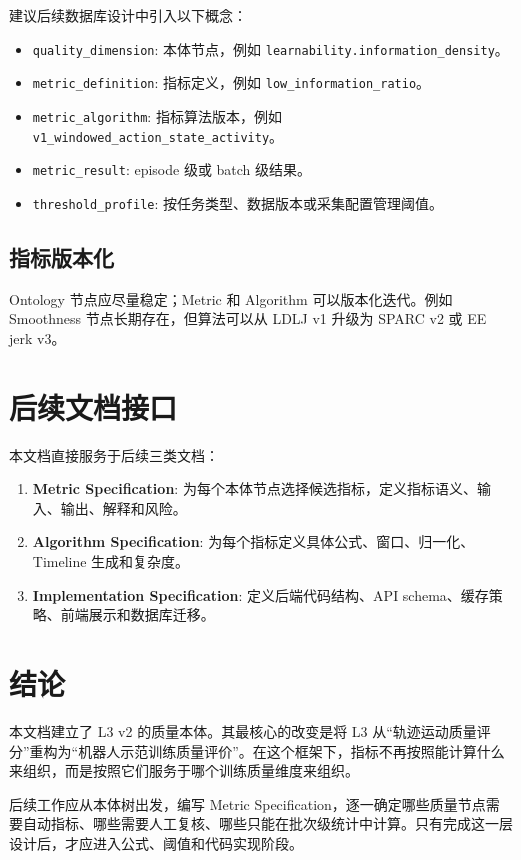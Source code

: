 \documentclass[UTF8,zihao=-4]{ctexart}
\newcommand{\Code}[1]{\texttt{#1}}
\newcommand{\Term}[1]{\textbf{#1}}
\begin{document}
建议后续数据库设计中引入以下概念：
\begin{itemize}
  \item \Code{quality\_dimension}: 本体节点，例如 \Code{learnability.information\_density}。
  \item \Code{metric\_definition}: 指标定义，例如 \Code{low\_information\_ratio}。
  \item \Code{metric\_algorithm}: 指标算法版本，例如 \Code{v1\_windowed\_action\_state\_activity}。
  \item \Code{metric\_result}: episode 级或 batch 级结果。
  \item \Code{threshold\_profile}: 按任务类型、数据版本或采集配置管理阈值。
\end{itemize}

\subsection{指标版本化}

Ontology 节点应尽量稳定；Metric 和 Algorithm 可以版本化迭代。例如 Smoothness 节点长期存在，但算法可以从 LDLJ v1 升级为 SPARC v2 或 EE jerk v3。

\section{后续文档接口}

本文档直接服务于后续三类文档：

\begin{enumerate}
  \item \Term{Metric Specification}: 为每个本体节点选择候选指标，定义指标语义、输入、输出、解释和风险。
  \item \Term{Algorithm Specification}: 为每个指标定义具体公式、窗口、归一化、Timeline 生成和复杂度。
  \item \Term{Implementation Specification}: 定义后端代码结构、API schema、缓存策略、前端展示和数据库迁移。
\end{enumerate}

\section{结论}

本文档建立了 L3 v2 的质量本体。其最核心的改变是将 L3 从“轨迹运动质量评分”重构为“机器人示范训练质量评价”。在这个框架下，指标不再按照能计算什么来组织，而是按照它们服务于哪个训练质量维度来组织。

后续工作应从本体树出发，编写 Metric Specification，逐一确定哪些质量节点需要自动指标、哪些需要人工复核、哪些只能在批次级统计中计算。只有完成这一层设计后，才应进入公式、阈值和代码实现阶段。
\end{document}

